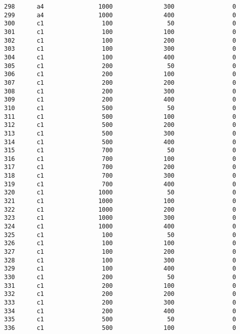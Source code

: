 \documentclass[11pt]{article}
\begin{document}
\begin{Verbatim}[commandchars=\\\{\}]
298      a4               1000              300                0   
299      a4               1000              400                0   
300      c1                100               50                0   
301      c1                100              100                0   
302      c1                100              200                0   
303      c1                100              300                0   
304      c1                100              400                0   
305      c1                200               50                0   
306      c1                200              100                0   
307      c1                200              200                0   
308      c1                200              300                0   
309      c1                200              400                0   
310      c1                500               50                0   
311      c1                500              100                0   
312      c1                500              200                0   
313      c1                500              300                0   
314      c1                500              400                0   
315      c1                700               50                0   
316      c1                700              100                0   
317      c1                700              200                0   
318      c1                700              300                0   
319      c1                700              400                0   
320      c1               1000               50                0   
321      c1               1000              100                0   
322      c1               1000              200                0   
323      c1               1000              300                0   
324      c1               1000              400                0   
325      c1                100               50                0   
326      c1                100              100                0   
327      c1                100              200                0   
328      c1                100              300                0   
329      c1                100              400                0   
330      c1                200               50                0   
331      c1                200              100                0   
332      c1                200              200                0   
333      c1                200              300                0   
334      c1                200              400                0   
335      c1                500               50                0   
336      c1                500              100                0   

\end{Verbatim}
\end{document}
